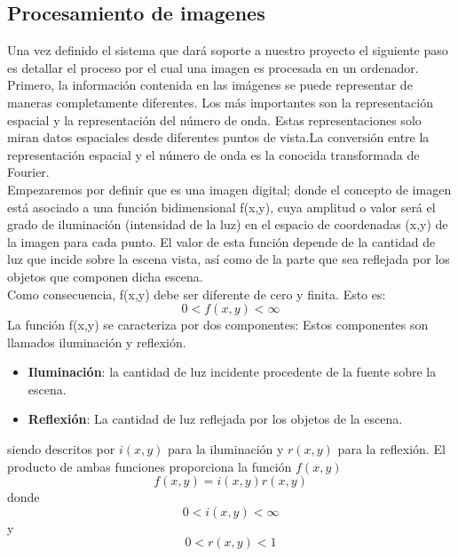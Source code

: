 \subsection{Procesamiento de imagenes}
Una vez definido el sistema que dará soporte a nuestro proyecto el siguiente paso es detallar el
proceso por el cual una imagen es procesada en un ordenador.\\
Primero, la información contenida en las imágenes se puede representar de maneras completamente diferentes.
Los más importantes son la representación espacial y la representación del número de onda. Estas representaciones solo
miran datos espaciales desde diferentes puntos de vista.La conversión entre la representación espacial y el número de
onda es la conocida transformada de Fourier.\cite{Book:Bernd1997} \\
Empezaremos por definir que es una imagen digital; donde el concepto de imagen está asociado a una función
bidimensional f(x,y), cuya amplitud o valor será el grado de iluminación (intensidad de la luz) en el espacio de
coordenadas (x,y) de la imagen para cada punto.\cite{Book:Arturo2011}
El valor de esta función depende de la
cantidad de luz que incide sobre la escena vista, así como de la parte que sea reflejada
por los objetos que componen dicha escena.\\
Como consecuencia, f(x,y) debe ser diferente de cero y finita. Esto es:
\begin{equation}
	0 < f(x,y) < \infty
\end{equation}
La función f(x,y) se caracteriza por dos componentes: Estos componentes son llamados
iluminación y reflexión.\cite{Book:Jose2005}
\begin{itemize}
	\item \textbf{Iluminación}: la cantidad de luz incidente procedente de la fuente sobre la
	      escena.
	\item \textbf{Reflexión}: La cantidad de luz reflejada por los objetos de la escena.
\end{itemize}
siendo descritos por $i(x,y)$ para la iluminación y $r(x,y)$ para la reflexión. El producto de ambas funciones
proporciona la función $f(x,y)$
\begin{equation}
	f(x,y) = i(x,y)r(x,y)
\end{equation}
donde
\begin{equation}
	0 < i(x,y) < \infty
\end{equation}
y
\begin{equation}
	0 < r(x,y) < 1
\end{equation}
